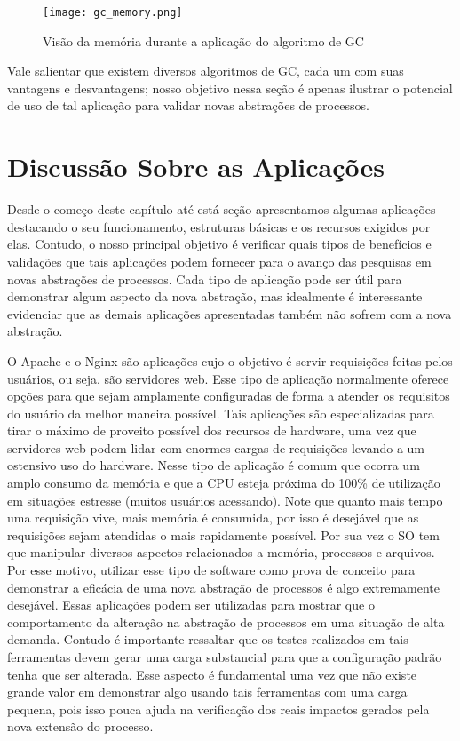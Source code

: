 \begin{figure}[!h]
  \centering
  \texttt{[image: gc\_memory.png]}
  \caption{Visão da memória durante a aplicação do algoritmo de GC\citep{gc_basics}}
  \label{fig:gc_mem}
\end{figure}

Vale salientar que existem diversos algoritmos de GC, cada um com suas
vantagens e desvantagens; nosso objetivo nessa seção é apenas ilustrar o
potencial de uso de tal aplicação para validar novas abstrações de processos.

\section{Discussão Sobre as Aplicações}
\label{sec:disc_app}

Desde o começo deste capítulo até está seção apresentamos algumas aplicações
destacando o seu funcionamento, estruturas básicas e os recursos exigidos por
elas. Contudo, o nosso principal objetivo é verificar quais tipos de benefícios
e validações que tais aplicações podem fornecer para o avanço das pesquisas em
novas abstrações de processos. Cada tipo de aplicação pode ser útil para
demonstrar algum aspecto da nova abstração, mas idealmente é interessante
evidenciar que as demais aplicações apresentadas também não sofrem com a nova
abstração.

O Apache e o Nginx são aplicações cujo o objetivo é servir requisições feitas
pelos usuários, ou seja, são servidores web. Esse tipo de aplicação normalmente
oferece opções para que sejam amplamente configuradas de forma a atender os
requisitos do usuário da melhor maneira possível. Tais aplicações são
especializadas para tirar o máximo de proveito possível dos recursos de hardware,
uma vez que servidores web podem lidar com enormes cargas de requisições
levando a um ostensivo uso do hardware. Nesse tipo de aplicação é comum que
ocorra um amplo consumo da memória e que a CPU esteja próxima do 100\% de
utilização em situações estresse (muitos usuários acessando).  Note que quanto
mais tempo uma requisição vive, mais memória é consumida, por isso é desejável
que as requisições sejam atendidas o mais rapidamente possível. Por sua vez o
SO tem que manipular diversos aspectos relacionados a memória, processos e
arquivos. Por esse motivo, utilizar esse tipo de software como prova de
conceito para demonstrar a eficácia de uma nova abstração de processos é algo
extremamente desejável. Essas aplicações podem ser utilizadas para mostrar que
o comportamento da alteração na abstração de processos em uma situação de alta
demanda. Contudo é importante ressaltar que os testes realizados em tais
ferramentas devem gerar uma carga substancial para que a configuração padrão
tenha que ser alterada. Esse aspecto é fundamental uma vez que não existe
grande valor em demonstrar algo usando tais ferramentas com uma carga pequena,
pois isso pouca ajuda na verificação dos reais impactos gerados pela nova
extensão do processo.

